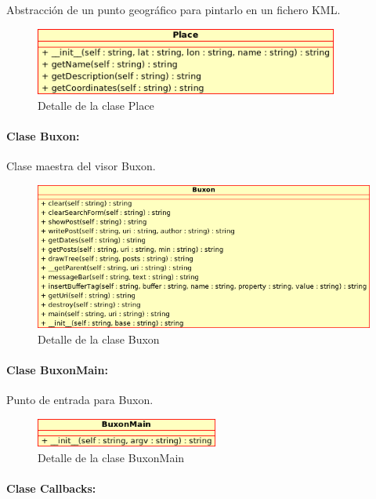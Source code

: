 Abstracción de un punto geográfico para pintarlo en un fichero KML.

\begin{figure}[H]
	\centering
 	\includegraphics[width=10cm]{images/uml/clases/place-class.png}
	\caption{Detalle de la clase Place}
	\label{fig:uml:place-class}
\end{figure}

\paragraph{Clase Buxon:}

Clase maestra del visor Buxon.

\begin{figure}[H]
	\centering
 	\includegraphics[width=13cm]{images/uml/clases/buxon-class.png}
	\caption{Detalle de la clase Buxon}
	\label{fig:uml:buxon-class}
\end{figure}

\paragraph{Clase BuxonMain:}

Punto de entrada para Buxon.

\begin{figure}[H]
	\centering
 	\includegraphics[width=6cm]{images/uml/clases/buxonmain-class.png}
	\caption{Detalle de la clase BuxonMain}
	\label{fig:uml:place-class}
\end{figure}

\paragraph{Clase Callbacks:}

